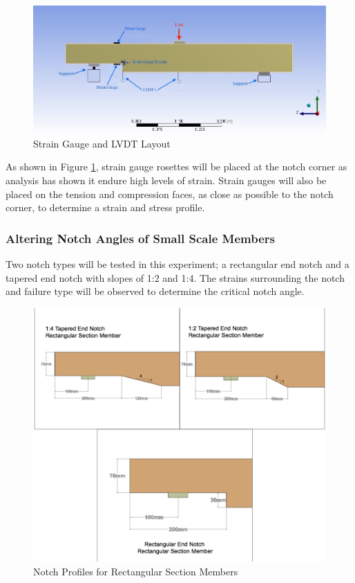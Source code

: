 \documentclass[11pt,a4paper]{article}
\numberwithin{equation}{subsection}
\begin{document}
 \begin{figure}[h]
 	\begin{center}
 		\includegraphics[scale=0.4]{Gauge_Set_up}
 	\end{center}
 	\caption{Strain Gauge and LVDT Layout}
 	\label{fig:Gauge}
 \end{figure}

\noindent
As shown in Figure \ref{fig:Gauge}, strain gauge rosettes will be placed at the notch corner as analysis has shown it endure high levels of strain. Strain gauges will also be placed on the tension and compression faces, as close as possible to the notch corner, to determine a strain and stress profile. 

\subsubsection{Altering Notch Angles of Small Scale Members}
Two notch types will be tested in this experiment; a rectangular end notch and a tapered end notch with slopes of 1:2 and 1:4. The strains surrounding the notch and failure type will be observed to determine the critical notch angle. 

\begin{figure}[h]
	\begin{center}
		\includegraphics[scale=0.25]{Notch_Angles}
	\end{center}
	\caption{Notch Profiles for Rectangular Section Members}
	\label{fig:Rectangular2}
\end{figure}
\pagebreak
\end{document}
